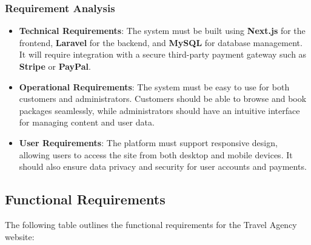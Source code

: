 \subsubsection{Requirement Analysis}
\begin{itemize}
    \item \textbf{Technical Requirements}: The system must be built using \textbf{Next.js} for the frontend, \textbf{Laravel} for the backend, and \textbf{MySQL} for database management. It will require integration with a secure third-party payment gateway such as \textbf{Stripe} or \textbf{PayPal}.
    \item \textbf{Operational Requirements}: The system must be easy to use for both customers and administrators. Customers should be able to browse and book packages seamlessly, while administrators should have an intuitive interface for managing content and user data.
    \item \textbf{User Requirements}: The platform must support responsive design, allowing users to access the site from both desktop and mobile devices. It should also ensure data privacy and security for user accounts and payments.
\end{itemize}

\subsection{Functional Requirements}

The following table outlines the functional requirements for the Travel Agency website:


